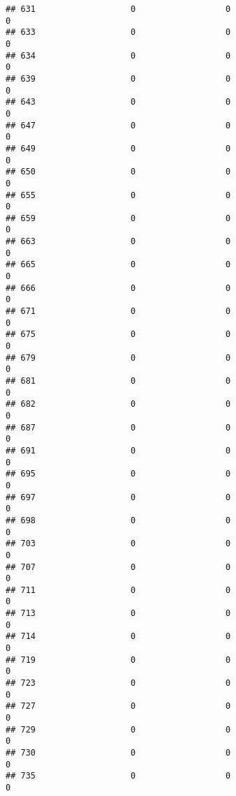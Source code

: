 \documentclass[
]{article}
\begin{document}
\begin{verbatim}
## 631                   0                  0                              0
## 633                   0                  0                              0
## 634                   0                  0                              0
## 639                   0                  0                              0
## 643                   0                  0                              0
## 647                   0                  0                              0
## 649                   0                  0                              0
## 650                   0                  0                              0
## 655                   0                  0                              0
## 659                   0                  0                              0
## 663                   0                  0                              0
## 665                   0                  0                              0
## 666                   0                  0                              0
## 671                   0                  0                              0
## 675                   0                  0                              0
## 679                   0                  0                              0
## 681                   0                  0                              0
## 682                   0                  0                              0
## 687                   0                  0                              0
## 691                   0                  0                              0
## 695                   0                  0                              0
## 697                   0                  0                              0
## 698                   0                  0                              0
## 703                   0                  0                              0
## 707                   0                  0                              0
## 711                   0                  0                              0
## 713                   0                  0                              0
## 714                   0                  0                              0
## 719                   0                  0                              0
## 723                   0                  0                              0
## 727                   0                  0                              0
## 729                   0                  0                              0
## 730                   0                  0                              0
## 735                   0                  0                              0

\end{verbatim}
\end{document}
